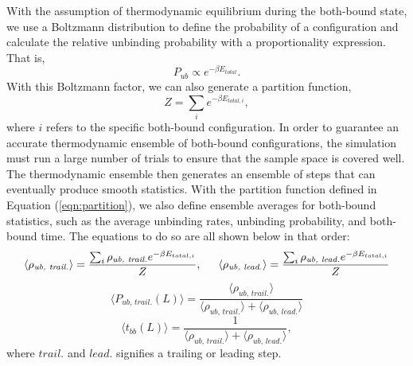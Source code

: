 With the assumption of thermodynamic equilibrium during the both-bound state, we use a Boltzmann distribution to define the probability of a configuration and calculate the relative unbinding probability with a proportionality expression. That is, 
\begin{equation}
	P_{ub}\propto e^{-\beta E_{total}}.
\end{equation}
With this Boltzmann factor, we can also generate a partition function, 
\begin{equation} \label{eqn:partition}
	Z=\sum_{i}e^{-\beta E_{total,i}},
\end{equation}
where $i$ refers to the specific both-bound configuration. In order to guarantee an accurate thermodynamic ensemble of both-bound configurations, the simulation must run a large number of trials to ensure that the sample space is covered well. The thermodynamic ensemble then generates an ensemble of steps that can eventually produce smooth statistics. With the partition function defined in Equation (\ref{eqn:partition}), we also define ensemble averages for both-bound statistics, such as the average unbinding rates, unbinding probability, and both-bound time. The equations to do so are all shown below in that order:
\begin{equation}
	\langle\rho_{\textit{ub, trail.}}\rangle=\frac{\sum_{i}\rho_{\textit{ub, trail.}} e^{-\beta E_{total,i}}}{Z}, \indent \langle\rho_{\textit{ub, lead.}}\rangle=\frac{\sum_{i}\rho_{\textit{ub, lead.}} e^{-\beta E_{total,i}}}{Z}
\end{equation}
\begin{equation} \label{eqn:ProbTrail}
	\langle P_{\textit{ub, trail.}}(L)\rangle = \frac{\langle\rho_{\textit{ub, trail.}}\rangle}{\langle\rho_{\textit{ub, trail.}}\rangle + \langle\rho_{\textit{ub, lead.}}\rangle}
\end{equation}
\begin{equation}
	\langle t_{bb}(L) \rangle =\frac{1}{\langle\rho_{\textit{ub, trail.}}\rangle + \langle\rho_{\textit{ub, lead.}}\rangle},
\end{equation}
where $trail.$ and $lead.$ signifies a trailing or leading step.




